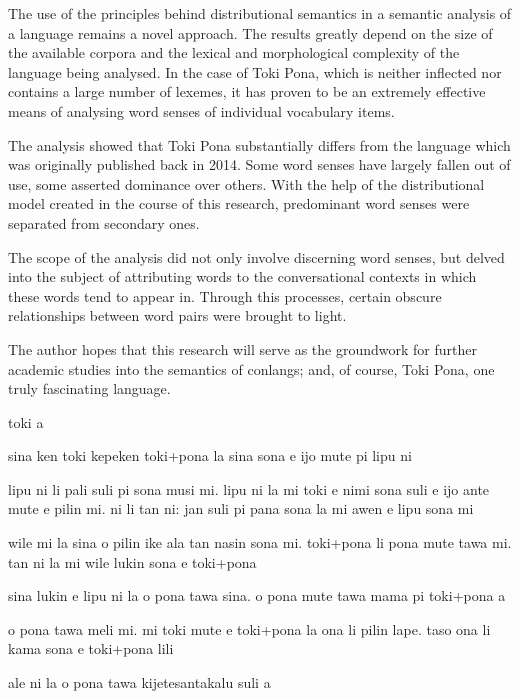 \documentclass[14pt, a4paper]{extreport}
\renewcommand{\baselinestretch}{1.5}
\begin{document}
The use of the principles behind distributional semantics in a semantic analysis of a language remains a novel approach. The results greatly depend on the size of the available corpora and the lexical and morphological complexity of the language being analysed. In the case of Toki Pona, which is neither inflected nor contains a large number of lexemes, it has proven to be an extremely effective means of analysing word senses of individual vocabulary items.

The analysis showed that Toki Pona substantially differs from the language which was originally published back in 2014. Some word senses have largely fallen out of use, some asserted dominance over others. With the help of the distributional model created in the course of this research, predominant word senses were separated from secondary ones.

The scope of the analysis did not only involve discerning word senses, but delved into the subject of attributing words to the conversational contexts in which these words tend to appear in. Through this processes, certain obscure relationships between word pairs were brought to light.

The author hopes that this research will serve as the groundwork for further academic studies into the semantics of conlangs; and, of course, Toki Pona, one truly fascinating language.
\smallskip

\vspace*{\fill}
  \begin{minipage}{0.69\textwidth}
    \newfontfamily{}
    \myfont\Large
    \setlength\parindent{0cm}
    \def\baselinestretch{1.15}\selectfont

    toki a

    \bigskip

    sina ken toki kepeken toki+pona la sina sona e ijo mute pi lipu ni

    \bigskip

    lipu ni li pali suli pi sona musi mi. lipu ni la mi toki e nimi sona suli e ijo ante mute e pilin mi. ni li tan ni: jan suli pi pana sona la mi awen e lipu sona mi

    \bigskip

    wile mi la sina o pilin ike ala tan nasin sona mi. toki+pona li pona mute tawa mi. tan ni la mi wile lukin sona e toki+pona

    \bigskip

    sina lukin e lipu ni la o pona tawa sina. o pona mute tawa mama pi toki+pona a

    \bigskip

    o pona tawa meli mi. mi toki mute e toki+pona la ona li pilin lape. taso ona li kama sona e toki+pona lili

    \bigskip

    ale ni la o pona tawa kijetesantakalu suli a

  \end{minipage}
\vspace*{\fill}
\end{document}
